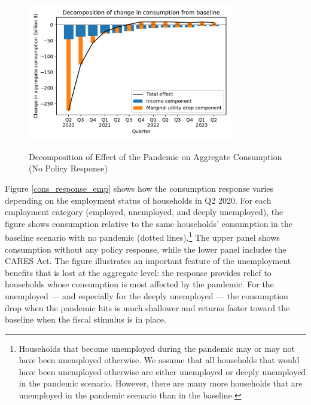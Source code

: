\begin{figure}
	\centering
	\caption{Decomposition of Effect of the Pandemic on Aggregate Consumption (No Policy Response)}
	\label{cons_response2}
	{ \includegraphics[width=0.8\textwidth]{./Figures/Decomposition}}
\end{figure}

Figure \ref{cons_response_emp} shows how the consumption response varies depending on the employment status of households in Q2 2020.
For each employment category (employed, unemployed, and deeply unemployed), the figure shows consumption relative to the same households' consumption in the baseline scenario with no pandemic (dotted lines).\footnote{Households that become unemployed during the pandemic may or may not have been unemployed otherwise. We assume that all households that would have been unemployed otherwise are either unemployed or deeply unemployed in the pandemic scenario. However, there are many more households that are unemployed in the pandemic scenario than in the baseline.}
The upper panel shows consumption without any policy response, while the lower panel includes the CARES Act.
The figure illustrates an important feature of the unemployment benefits that is lost at the aggregate level: the response provides relief to households whose consumption is most affected by the pandemic.
For the unemployed --- and especially for the deeply unemployed --- the consumption drop when the pandemic hits is much shallower and returns faster toward the baseline when the fiscal stimulus is in place.

